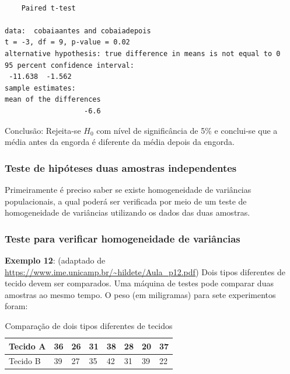 \documentclass[12pt,brazil,oneside]{book}
\begin{document}
\begin{verbatim}

    Paired t-test

data:  cobaiaantes and cobaiadepois
t = -3, df = 9, p-value = 0.02
alternative hypothesis: true difference in means is not equal to 0
95 percent confidence interval:
 -11.638  -1.562
sample estimates:
mean of the differences 
                   -6.6 
\end{verbatim}

Conclusão: Rejeita-se \(H_0\) com nível de significância de 5\% e conclui-se que a média antes da engorda é diferente da média depois da engorda.

\hypertarget{teste-de-hipoteses-duas-amostras-independentes}{%
\subsubsection{Teste de hipóteses duas amostras independentes}\label{teste-de-hipoteses-duas-amostras-independentes}}

Primeiramente é preciso saber se existe homogeneidade de variâncias populacionais, a qual poderá ser verificada por meio de um teste de homogeneidade de variâncias utilizando os dados das duas amostras.

\hypertarget{teste-para-verificar-homogeneidade-de-variancias}{%
\subsubsection{Teste para verificar homogeneidade de variâncias}\label{teste-para-verificar-homogeneidade-de-variancias}}

\textbf{Exemplo 12}: (adaptado de \url{https://www.ime.unicamp.br/~hildete/Aula_p12.pdf}) Dois tipos diferentes de tecido devem ser comparados. Uma máquina de testes pode comparar duas amostras ao mesmo tempo. O peso (em miligramas) para sete experimentos foram:

\begin{table}[t]

\caption{\label{tab:unnamed-chunk-147}Comparação de dois tipos diferentes de tecidos}
\centering
\begin{tabular}{l|l|l|l|l|l|l|l}
\hline
Tecido A & 36 & 26 & 31 & 38 & 28 & 20 & 37\\
\hline
Tecido B & 39 & 27 & 35 & 42 & 31 & 39 & 22\\
\hline
\end{tabular}
\end{table}
\end{document}
